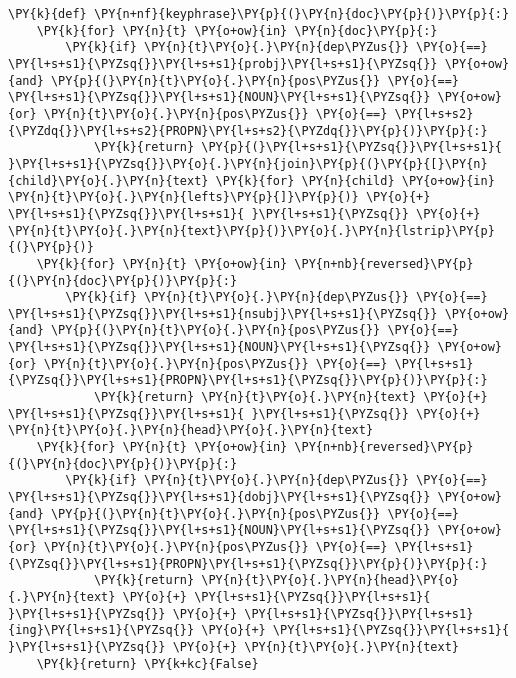     \begin{tcolorbox}[breakable, size=fbox, boxrule=1pt, pad at break*=1mm,colback=cellbackground, colframe=cellborder]
\begin{Verbatim}[commandchars=\\\{\}]
\PY{k}{def} \PY{n+nf}{keyphrase}\PY{p}{(}\PY{n}{doc}\PY{p}{)}\PY{p}{:}
    \PY{k}{for} \PY{n}{t} \PY{o+ow}{in} \PY{n}{doc}\PY{p}{:}
        \PY{k}{if} \PY{n}{t}\PY{o}{.}\PY{n}{dep\PYZus{}} \PY{o}{==} \PY{l+s+s1}{\PYZsq{}}\PY{l+s+s1}{probj}\PY{l+s+s1}{\PYZsq{}} \PY{o+ow}{and} \PY{p}{(}\PY{n}{t}\PY{o}{.}\PY{n}{pos\PYZus{}} \PY{o}{==} \PY{l+s+s1}{\PYZsq{}}\PY{l+s+s1}{NOUN}\PY{l+s+s1}{\PYZsq{}} \PY{o+ow}{or} \PY{n}{t}\PY{o}{.}\PY{n}{pos\PYZus{}} \PY{o}{==} \PY{l+s+s2}{\PYZdq{}}\PY{l+s+s2}{PROPN}\PY{l+s+s2}{\PYZdq{}}\PY{p}{)}\PY{p}{:}
            \PY{k}{return} \PY{p}{(}\PY{l+s+s1}{\PYZsq{}}\PY{l+s+s1}{ }\PY{l+s+s1}{\PYZsq{}}\PY{o}{.}\PY{n}{join}\PY{p}{(}\PY{p}{[}\PY{n}{child}\PY{o}{.}\PY{n}{text} \PY{k}{for} \PY{n}{child} \PY{o+ow}{in} \PY{n}{t}\PY{o}{.}\PY{n}{lefts}\PY{p}{]}\PY{p}{)} \PY{o}{+} \PY{l+s+s1}{\PYZsq{}}\PY{l+s+s1}{ }\PY{l+s+s1}{\PYZsq{}} \PY{o}{+} \PY{n}{t}\PY{o}{.}\PY{n}{text}\PY{p}{)}\PY{o}{.}\PY{n}{lstrip}\PY{p}{(}\PY{p}{)}
    \PY{k}{for} \PY{n}{t} \PY{o+ow}{in} \PY{n+nb}{reversed}\PY{p}{(}\PY{n}{doc}\PY{p}{)}\PY{p}{:}
        \PY{k}{if} \PY{n}{t}\PY{o}{.}\PY{n}{dep\PYZus{}} \PY{o}{==} \PY{l+s+s1}{\PYZsq{}}\PY{l+s+s1}{nsubj}\PY{l+s+s1}{\PYZsq{}} \PY{o+ow}{and} \PY{p}{(}\PY{n}{t}\PY{o}{.}\PY{n}{pos\PYZus{}} \PY{o}{==} \PY{l+s+s1}{\PYZsq{}}\PY{l+s+s1}{NOUN}\PY{l+s+s1}{\PYZsq{}} \PY{o+ow}{or} \PY{n}{t}\PY{o}{.}\PY{n}{pos\PYZus{}} \PY{o}{==} \PY{l+s+s1}{\PYZsq{}}\PY{l+s+s1}{PROPN}\PY{l+s+s1}{\PYZsq{}}\PY{p}{)}\PY{p}{:}
            \PY{k}{return} \PY{n}{t}\PY{o}{.}\PY{n}{text} \PY{o}{+} \PY{l+s+s1}{\PYZsq{}}\PY{l+s+s1}{ }\PY{l+s+s1}{\PYZsq{}} \PY{o}{+} \PY{n}{t}\PY{o}{.}\PY{n}{head}\PY{o}{.}\PY{n}{text}
    \PY{k}{for} \PY{n}{t} \PY{o+ow}{in} \PY{n+nb}{reversed}\PY{p}{(}\PY{n}{doc}\PY{p}{)}\PY{p}{:}
        \PY{k}{if} \PY{n}{t}\PY{o}{.}\PY{n}{dep\PYZus{}} \PY{o}{==} \PY{l+s+s1}{\PYZsq{}}\PY{l+s+s1}{dobj}\PY{l+s+s1}{\PYZsq{}} \PY{o+ow}{and} \PY{p}{(}\PY{n}{t}\PY{o}{.}\PY{n}{pos\PYZus{}} \PY{o}{==} \PY{l+s+s1}{\PYZsq{}}\PY{l+s+s1}{NOUN}\PY{l+s+s1}{\PYZsq{}} \PY{o+ow}{or} \PY{n}{t}\PY{o}{.}\PY{n}{pos\PYZus{}} \PY{o}{==} \PY{l+s+s1}{\PYZsq{}}\PY{l+s+s1}{PROPN}\PY{l+s+s1}{\PYZsq{}}\PY{p}{)}\PY{p}{:}
            \PY{k}{return} \PY{n}{t}\PY{o}{.}\PY{n}{head}\PY{o}{.}\PY{n}{text} \PY{o}{+} \PY{l+s+s1}{\PYZsq{}}\PY{l+s+s1}{ }\PY{l+s+s1}{\PYZsq{}} \PY{o}{+} \PY{l+s+s1}{\PYZsq{}}\PY{l+s+s1}{ing}\PY{l+s+s1}{\PYZsq{}} \PY{o}{+} \PY{l+s+s1}{\PYZsq{}}\PY{l+s+s1}{ }\PY{l+s+s1}{\PYZsq{}} \PY{o}{+} \PY{n}{t}\PY{o}{.}\PY{n}{text}
    \PY{k}{return} \PY{k+kc}{False}
\end{Verbatim}
\end{tcolorbox}

